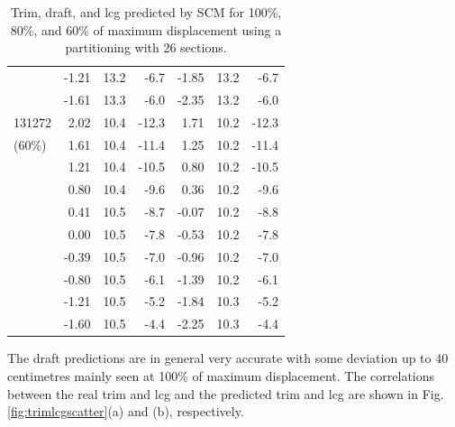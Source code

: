 \documentclass[runningheads]{llncs}
\begin{document}
\begin{table}[h!]
\begin{tabular}{l|@{\:\:}rrr@{\:\:}|@{\:\:}rrr}
                &-1.21   &13.2    &-6.7     &-1.85   &13.2&-6.7   \\
                &-1.61   &13.3    &-6.0     &-2.35   &13.2&-6.0   \\
\hline \rule{0pt}{3ex}
131272  &2.02      &10.4    &-12.3   &1.71    &10.2&-12.3  \\
(60\%)  &1.61    &10.4    &-11.4   &1.25    &10.2&-11.4  \\
                &1.21    &10.4    &-10.5   &0.80    &10.2&-10.5  \\
                &0.80    &10.4    &-9.6     &0.36    &10.2&-9.6   \\
                &0.41    &10.5    &-8.7     &-0.07   &10.2&-8.8   \\
                &0.00    &10.5    &-7.8     &-0.53   &10.2&-7.8   \\
                &-0.39   &10.5    &-7.0     &-0.96   &10.2&-7.0   \\
                &-0.80   &10.5    &-6.1     &-1.39   &10.2&-6.1   \\
                &-1.21   &10.5    &-5.2     &-1.84   &10.3&-5.2   \\
                &-1.60   &10.5    &-4.4     &-2.25   &10.3&-4.4   \\
\end{tabular}
\caption{Trim, draft, and lcg predicted by SCM for 100\%, 80\%, and 60\% of maximum displacement using a partitioning with 26 sections.}
\label{tbl:variabledips}
\end{table}
The draft predictions are in general very accurate with some deviation up to 40 centimetres mainly seen at 100\% of maximum displacement. The correlations between the real trim and lcg and the predicted trim and lcg are shown in Fig.\ref{fig:trimlcgscatter}(a) and (b), respectively.
\end{document}
